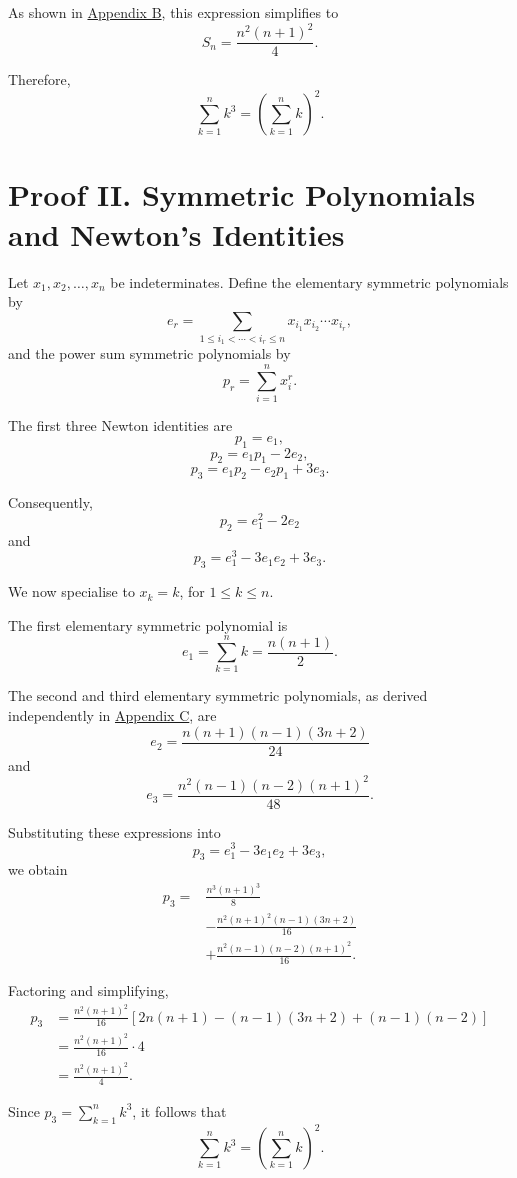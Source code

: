 \documentclass[11pt,a4paper]{article}
\begin{document}
As shown in \hyperref[appendix:binomial-simplification]{Appendix B}, this expression simplifies to
\[
S_n=\frac{n^2(n+1)^2}{4}.
\]

Therefore,
\[
\boxed{
\sum_{k=1}^{n}k^3
=
\left(\sum_{k=1}^{n}k\right)^2
}.
\]


\section*{Proof II. Symmetric Polynomials and Newton's Identities}

Let $x_1,x_2,\ldots,x_n$ be indeterminates. Define the
elementary symmetric polynomials by
\[
e_r=
\sum_{1\leq i_1<\cdots<i_r\leq n}
x_{i_1}x_{i_2}\cdots x_{i_r},
\]
and the power sum symmetric polynomials by
\[
p_r=\sum_{i=1}^{n}x_i^r.
\]

The first three Newton identities are
\[
p_1=e_1,
\]
\[
p_2=e_1p_1-2e_2,
\]
\[
p_3=e_1p_2-e_2p_1+3e_3.
\]

Consequently,
\[
p_2=e_1^2-2e_2
\]
and
\[
\boxed{p_3=e_1^3-3e_1e_2+3e_3}.
\]

We now specialise to $x_k=k$, for $1\leq k\leq n$.

The first elementary symmetric polynomial is
\[
e_1=\sum_{k=1}^{n}k
=\frac{n(n+1)}{2}.
\]

The second and third elementary symmetric polynomials,
as derived independently in \hyperref[appendix:symmetric-polynomials]{Appendix C}, are
\[
e_2=
\frac{n(n+1)(n-1)(3n+2)}{24}
\]
and
\[
e_3=
\frac{n^2(n-1)(n-2)(n+1)^2}{48}.
\]

Substituting these expressions into
\[
p_3=e_1^3-3e_1e_2+3e_3,
\]
we obtain
\[
\begin{aligned}
p_3
={}&\frac{n^3(n+1)^3}{8}\\
&-\frac{n^2(n+1)^2(n-1)(3n+2)}{16}\\
&+\frac{n^2(n-1)(n-2)(n+1)^2}{16}.
\end{aligned}
\]

Factoring and simplifying,
\[
\begin{aligned}
p_3
&=\frac{n^2(n+1)^2}{16}
\left[
2n(n+1)
-(n-1)(3n+2)
+(n-1)(n-2)
\right]\\
&=\frac{n^2(n+1)^2}{16}\cdot 4\\
&=\frac{n^2(n+1)^2}{4}.
\end{aligned}
\]

Since $p_3=\sum_{k=1}^{n}k^3$, it follows that
\[
\boxed{
\sum_{k=1}^{n}k^3
=
\left(\sum_{k=1}^{n}k\right)^2
}.
\]
\end{document}
